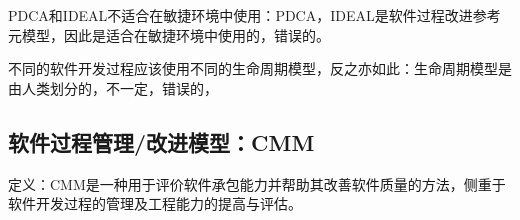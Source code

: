 \begin{problem}
{\kaishu PDCA和IDEAL不适合在敏捷环境中使用：}PDCA，IDEAL是软件过程改进参考元模型，因此是适合在敏捷环境中使用的，错误的。
\end{problem}

\begin{problem}
{\kaishu 不同的软件开发过程应该使用不同的生命周期模型，反之亦如此：}生命周期模型是由人类划分的，不一定，错误的，
\end{problem}



\subsection{软件过程管理/改进模型：CMM}
定义：CMM是一种用于评价软件承包能力并帮助其改善软件质量的方法，侧重于软件开发过程的管理及工程能力的提高与评估。

